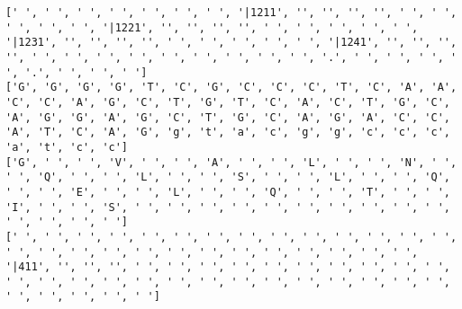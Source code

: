 \documentclass{article}
\begin{document}
\begin{Verbatim}
[' ', ' ', ' ', ' ', ' ', ' ', ' ', '|1211', '', '', '', '', ' ', ' ', ' ', ' ', ' ', '|1221', '', '', '', '', ' ', ' ', ' ', ' ', ' ', '|1231', '', '', '', '', ' ', ' ', ' ', ' ', ' ', '|1241', '', '', '', '', ' ', ' ', ' ', ' ', ' ', ' ', ' ', ' ', ' ', '.', ' ', ' ', ' ', ' ', '.', ' ', ' ', ' ']
['G', 'G', 'G', 'G', 'T', 'C', 'G', 'C', 'C', 'C', 'T', 'C', 'A', 'A', 'C', 'C', 'A', 'G', 'C', 'T', 'G', 'T', 'C', 'A', 'C', 'T', 'G', 'C', 'A', 'G', 'G', 'A', 'G', 'C', 'T', 'G', 'C', 'A', 'G', 'A', 'C', 'C', 'A', 'T', 'C', 'A', 'G', 'g', 't', 'a', 'c', 'g', 'g', 'c', 'c', 'c', 'a', 't', 'c', 'c']
['G', ' ', ' ', 'V', ' ', ' ', 'A', ' ', ' ', 'L', ' ', ' ', 'N', ' ', ' ', 'Q', ' ', ' ', 'L', ' ', ' ', 'S', ' ', ' ', 'L', ' ', ' ', 'Q', ' ', ' ', 'E', ' ', ' ', 'L', ' ', ' ', 'Q', ' ', ' ', 'T', ' ', ' ', 'I', ' ', ' ', 'S', ' ', ' ', ' ', ' ', ' ', ' ', ' ', ' ', ' ', ' ', ' ', ' ', ' ', ' ']
[' ', ' ', ' ', ' ', ' ', ' ', ' ', ' ', ' ', ' ', ' ', ' ', ' ', ' ', ' ', ' ', ' ', ' ', ' ', ' ', ' ', ' ', ' ', ' ', ' ', ' ', ' ', '|411', '', '', '', ' ', ' ', ' ', ' ', ' ', ' ', ' ', ' ', ' ', ' ', ' ', ' ', ' ', ' ', ' ', ' ', ' ', ' ', ' ', ' ', ' ', ' ', ' ', ' ', ' ', ' ', ' ', ' ', ' ']
  

\end{Verbatim}
\end{document}
